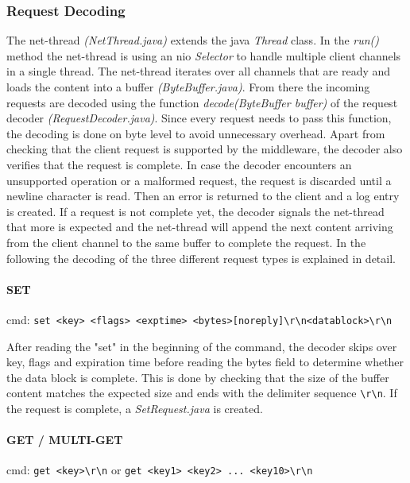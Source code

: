 \documentclass[report.tex]{subfiles}
\begin{document}
\subsubsection{Request Decoding}\label{request-decoding}
The net-thread \emph{(NetThread.java)} extends the java \emph{Thread} class. In the \emph{run()} method the net-thread is using an nio \emph{Selector} to handle multiple client channels in a single thread. The net-thread iterates over all channels that are ready and loads the content into a buffer \emph{(ByteBuffer.java)}. From there the incoming requests are decoded using the function \emph{decode(ByteBuffer buffer)} of the request decoder \emph{(RequestDecoder.java)}. Since every request needs to pass this function, the decoding is done on byte level to avoid unnecessary overhead.
Apart from checking that the client request is supported by the middleware, the decoder also verifies that the request is complete. In case the decoder encounters an unsupported operation or a malformed request, the request is discarded until a newline character is read. 
Then an error is returned to the client and a log entry is created. If a request is not complete yet, the decoder signals the net-thread that more is expected and the net-thread will append the next content arriving from the client channel to the same buffer to complete the request.
In the following the decoding of the three different request types is explained in detail.

\paragraph{SET} cmd: \texttt{set <key> <flags> <exptime> <bytes>[noreply]\textbackslash r\textbackslash n<datablock>\textbackslash r\textbackslash n} 

After reading the "set" in the beginning of the command, the decoder skips over key, flags and expiration time before reading the bytes field to determine whether the data block is complete. This is done by checking that the size of the buffer content matches the expected size and ends with the delimiter sequence \texttt{\textbackslash r\textbackslash n}.
If the request is complete, a \emph{SetRequest.java} is created.

\paragraph{GET / MULTI-GET} cmd: \texttt{get <key>\textbackslash r\textbackslash n} or \texttt{get <key1> <key2> ... <key10>\textbackslash r\textbackslash n}
\end{document}
